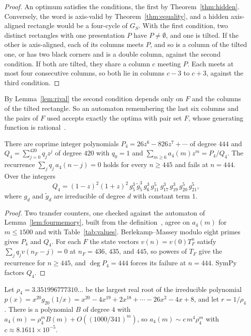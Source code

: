 \begin{proof}
An optimum satisfies the conditions, the first by Theorem~\ref{thm:hidden}. Conversely, the word is axis-valid by Theorem~\ref{thm:equality}, and a hidden axis-aligned rectangle would be a four-cycle of $G_S$. With the first condition, two distinct rectangles with one presentation $P$ have $P\ne\emptyset$, and one is tilted. If the other is axis-aligned, each of its columns meets $P$, and so is a column of the tilted one, or has two black corners and is a double column, against the second condition. If both are tilted, they share a column $c$ meeting $P$. Each meets at most four consecutive columns, so both lie in columns $c-3$ to $c+3$, against the third condition.
\end{proof}

By Lemma~\ref{lem:rival} the second condition depends only on $F$ and the columns of the tilted rectangle. So an automaton remembering the last six columns and the pairs of $F$ used accepts exactly the optima with pair set $F$, whose generating function is rational~\cite[Section~V.5]{flajolet2009}.

\begin{theorem}\label{thm:fourgfexact}
There are coprime integer polynomials $P_4=26z^6-826z^7+\cdots$ of degree $444$ and $Q_4=\sum_{j=0}^{420}q_jz^j$ of degree $420$ with $q_0=1$ and $\sum_{m\ge6}a_4(m)z^m=P_4/Q_4$. The recurrence $\sum_jq_j\,a_4(n-j)=0$ holds for every $n\ge445$ and fails at $n=444$. Over the integers
\[
Q_4=(1-z)^2(1+z)^2\,g_5^3\,\tilde g_5^3\,g_6^3\,g_{11}^5\,g_{17}^3\,g_{19}^3\,g_{20}^5\,g_{21}^5,
\]
where $g_d$ and $\tilde g_d$ are irreducible of degree $d$ with constant term $1$.
\end{theorem}

\begin{proof}
Two transfer counters, one checked against the automaton of Lemma~\ref{lem:fourmemory}, built from the definition~\cite{repo}, agree on $a_4(m)$ for $m\le1500$ and with Table~\ref{tab:values}. Berlekamp--Massey modulo eight primes gives $P_4$ and $Q_4$. For each $F$ the state vectors $v(n)=v(0)T_F^n$ satisfy $\sum_jq_jv(n_F-j)=0$ at $n_F=436$, $435$, and $445$, so powers of $T_F$ give the recurrence for $n\ge445$, and $\deg P_4=444$ forces its failure at $n=444$. SymPy factors $Q_4$.
\end{proof}

\begin{corollary}\label{cor:fourgrowth}
Let $\rho_4=3.351996777310\ldots$ be the largest real root of the irreducible polynomial $p(x)=x^{20}g_{20}(1/x)=x^{20}-4x^{19}+2x^{18}+\cdots-26x^2-4x+8$, and let $r=1/\rho_4$. There is a polynomial $B$ of degree $4$ with $a_4(m)=\rho_4^m B(m)+O((1000/341)^m)$, so $a_4(m)\sim c\,m^4\rho_4^m$ with $c\approx8.1611\times10^{-5}$.
\end{corollary}


